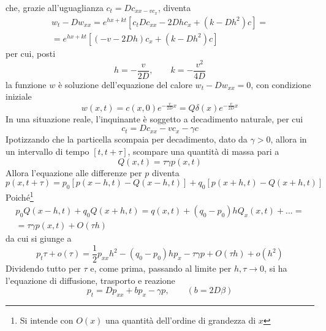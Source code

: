 \documentclass[a4paper,12pt, draft]{article}
\theoremstyle{break}
\numberwithin{equation}{section}
\begin{document}
che, grazie all'uguaglianza \(c_t = Dc_{xx - vc_x}\), diventa
\begin{align*}
  w_t -Dw_{xx} = e^{hx+kt}[c_t Dc_{xx} - 2Dhc_x + (k-Dh^2)c] = \\
  = e^{hx+kt}[(-v-2Dh)c_x + (k-Dh^2)c]
\end{align*}
per cui, posti
\[
  h=-\frac{v}{2D}, \qquad k = -\frac{v^2}{4D}
\]
la funzione \(w\) è soluzione dell'equazione del calore \(w_t -Dw_{xx} = 0\), con condizione iniziale 
\[
  w(x,t) = c(x,0)e^{-\frac{v}{2D}x}=Q\delta(x)e^{-\frac{v}{2D}x}
\]
In una situazione reale, l'inquinante è soggetto a decadimento naturale, per cui
\begin{equation}
  c_t = Dc_{xx}-vc_x-\gamma c
\end{equation}
Ipotizzando che la particella scompaia per decadimento, dato da \(\gamma > 0\), allora in un intervallo di tempo \([t, t+\tau]\), scompare una quantità di massa pari a
\[
  Q(x,t) = \tau \gamma p(x,t)
\]
Allora l'equazione alle differenze per \(p\) diventa
\[
  p(x, t+\tau) = p_0 [p(x-h, t) - Q(x-h, t)] + q_0[p(x+h,t) - Q(x+h,t)]
\]
Poiché\footnote{Si intende con \(O(x)\) una quantità dell'ordine di grandezza di \(x\)}
\begin{align*}
  p_0Q(x-h, t) + q_0Q(x+h, t) = q(x,t) + (q_0 -p_0)hQ_x(x,t)+ \ldots = \\
  = \tau \gamma p(x,t) + O(\tau h)
\end{align*}
da cui si giunge a 
\[
  p_t \tau + o(\tau) = \frac{1}{2}p_{xx}h^2 - (q_0-p_0)hp_x- \tau \gamma p + O(\tau h) + o(h^2)
\]
Dividendo tutto per \(\tau\) e, come prima, passando al limite per \(h, \tau \to 0\), si ha l'equazione di diffusione, trasporto e reazione
\[
  p_t = Dp_{xx} + bp_x - \gamma p, \qquad (b = 2D\beta)
\]
\end{document}
